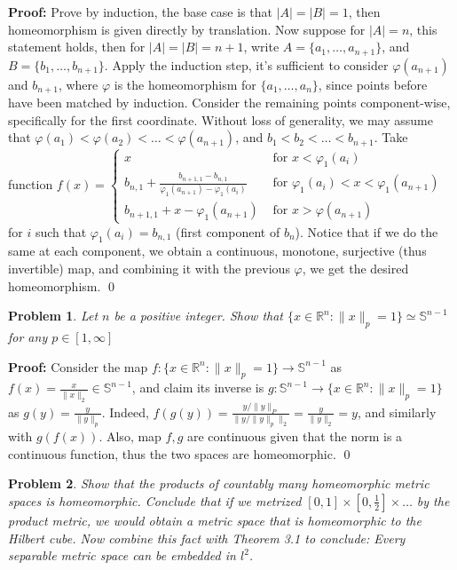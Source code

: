 \documentclass[12pt]{article}
\newtheorem{problem}{Problem}
\begin{document}
\textbf{Proof:} Prove by induction, the base case is that $|A|=|B|=1$, then homeomorphism is given directly by translation. Now suppose for $|A|=n$, this statement holds, then for $|A|=|B|=n+1$, write $A=\{a_{1}, \dots, a_{n+1}\}$, and $B=\{b_{1}, \dots, b_{n+1}\}$. Apply the induction step, it's sufficient to consider $\varphi(a_{n+1})$ and $b_{n+1}$, where $\varphi$ is the homeomorphism for $\{a_{1}, \dots, a_{n}\}$, since points before have been matched by induction. Consider the remaining points component-wise, specifically for the first coordinate. Without loss of generality, we may assume that $\varphi(a_{1}) < \varphi(a_{2}) <\dots < \varphi(a_{n+1})$, and $b_{1} < b_{2} < \dots < b_{n+1}$. Take function $f(x)=\begin{cases}
  x& \text{ for } x < \varphi_{1}(a_{i}) \\
  b_{n, 1}+\frac{b_{n+1, 1}-b_{n, 1}}{\varphi_{1}(a_{n+1})-\varphi_{1}(a_{i})}& \text{ for } \varphi_{1}(a_{i}) < x < \varphi_{1}(a_{n+1})\\
  b_{n+1, 1} + x - \varphi_{1}(a_{n+1})& \text{ for } x > \varphi(a_{n+1})
\end{cases}$ \\
for $i$ such that $\varphi_{1}(a_{i})=b_{n,1}$ (first component of $b_{n}$). Notice that if we do the same at each component, we obtain a continuous, monotone, surjective (thus invertible) map, and combining it with the previous $\varphi$, we get the desired homeomorphism. \qed
\\
\begin{problem}
Let $n$ be a positive integer. Show that $\{x\in\mathbb{R}^{n}: \|x\|_{p}=1\}\simeq \mathbb{S}^{n-1}$ for any $p\in[1, \infty]$
\end{problem}

\textbf{Proof:} Consider the map $f: \{x\in\mathbb{R}^{n}: \|x\|_{p}=1\} \to \mathbb{S}^{n-1}$ as $f(x)=\frac{x}{\|x\|_{2}}\in \mathbb{S}^{n-1}$, and claim its inverse is 
 $g: \mathbb{S}^{n-1}\to \{x\in\mathbb{R}^{n}: \|x\|_{p}=1\}$ as $g(y)=\frac{y}{\|y\|_{p}}$. Indeed, $f(g(y))=\frac{y/\|y\|_{P}}{\|y/\|y\|_{p}\|_{2}}=\frac{y}{\|y\|_{2}}=y$, and similarly with $g(f(x))$. Also, map $f,g$ are continuous given that the norm is a continuous function, thus the two spaces are homeomorphic. \qed
\\
\begin{problem}
Show that the products of countably many homeomorphic metric spaces is homeomorphic. Conclude that if we metrized $[0,1]\times [0,\frac{1}{2}]\times \dots$ by the product metric, we would obtain a metric space that is homeomorphic to the Hilbert cube. Now combine this fact with Theorem 3.1 to conclude: Every separable metric space can be embedded in $l^{2}$.
\end{problem}
\end{document}
